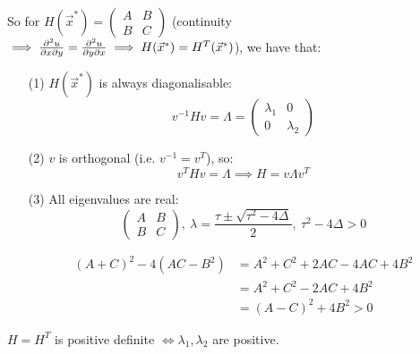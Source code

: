 \documentclass[twoside]{scrartcl}
\begin{document}
So for $H(\vec{x}^*) = \begin{pmatrix}
 A & B \\ B & C	
 \end{pmatrix}
$ (continuity $\implies \frac{\partial^2u}{\partial x \partial y} = \frac{\partial^2u}{\partial y \partial x} \implies H(\vec{x}^*) = H^T(\vec{x}^*)$), we have that:
\begin{enumerate}
\item[(1)] $H(\vec{x}^*)$ is always diagonalisable: 
\[v^{-1}Hv = \Lambda = \begin{pmatrix}
 \lambda_1 & 0 \\ 0 & \lambda_2	
 \end{pmatrix}
\]

\item[(2)] $v$ is orthogonal (i.e. $v^{-1} = v^T$), so: 
\[v^THv = \Lambda \implies H = v \Lambda v^T\]

\item[(3)] All eigenvalues are real:
\[\begin{pmatrix}
A & B \\ B & C	
\end{pmatrix},~
\lambda = \frac{\tau \pm \sqrt{\tau^2 - 4\Delta}}{2}
,~\tau^2-4\Delta > 0\]

\[\begin{aligned}
(A+C)^2 - 4(AC - B^2) &= A^2 + C^2 + 2AC - 4AC + 4B^2\\
&= A^2 + C^2 - 2AC + 4B^2\\
&= (A-C)^2 + 4B^2 > 0	
\end{aligned}
\]

\end{enumerate}


\begin{theorem}
$H = H^T$ is positive definite $\iff \lambda_1,\lambda_2$ are positive.	
\end{theorem}
\end{document}
